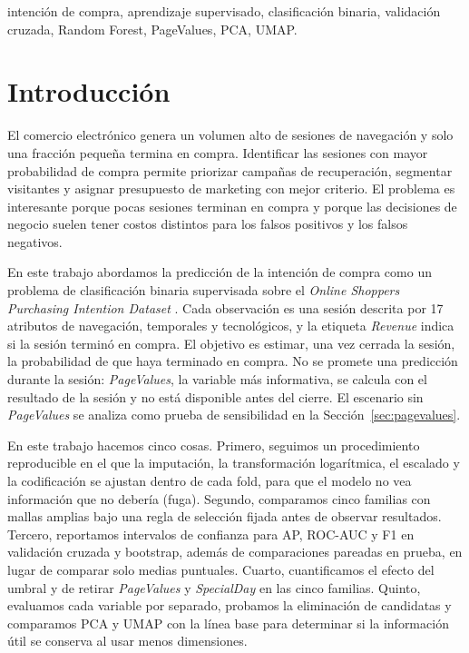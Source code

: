\documentclass[journal]{IEEEtran}
\begin{document}
\begin{IEEEkeywords}
	intención de compra, aprendizaje supervisado, clasificación binaria, validación
	cruzada, Random Forest, PageValues, PCA, UMAP.
\end{IEEEkeywords}

\section{Introducción}

El comercio electrónico genera un volumen alto de sesiones de navegación y solo una
fracción pequeña termina en compra. Identificar las sesiones con mayor probabilidad de
compra permite priorizar campañas de recuperación, segmentar visitantes y asignar
presupuesto de marketing con mejor criterio. El problema es interesante porque pocas sesiones
terminan en compra y porque las decisiones de negocio suelen tener costos distintos
para los falsos positivos y los falsos negativos.

En este trabajo abordamos la predicción de la intención de compra como un problema de
clasificación binaria supervisada sobre el \textit{Online Shoppers Purchasing Intention
Dataset} \cite{ref_dataset}. Cada observación es una sesión descrita por 17 atributos de
navegación, temporales y tecnológicos, y la etiqueta \textit{Revenue} indica si la sesión
terminó en compra. El objetivo es estimar, una vez cerrada la sesión, la probabilidad de
que haya terminado en compra. No se promete una predicción durante la sesión:
\textit{PageValues}, la variable más informativa, se calcula con el resultado de la
sesión y no está disponible antes del cierre. El escenario sin \textit{PageValues} se
analiza como prueba de sensibilidad en la Sección~\ref{sec:pagevalues}.

En este trabajo hacemos cinco cosas. Primero, seguimos un procedimiento reproducible en el que la
imputación, la transformación logarítmica, el escalado y la codificación se ajustan dentro
de cada fold, para que el modelo no vea información que no debería (fuga). Segundo, comparamos cinco familias con
mallas amplias bajo una regla de selección fijada antes de observar resultados. Tercero,
reportamos intervalos de confianza para AP, ROC-AUC y F1 en validación cruzada y bootstrap,
además de comparaciones pareadas en prueba, en lugar de comparar solo medias puntuales.
Cuarto, cuantificamos el efecto del umbral y de retirar \textit{PageValues} y
\textit{SpecialDay} en las cinco familias. Quinto, evaluamos cada variable por separado,
probamos la eliminación de candidatas y comparamos PCA y UMAP con la línea base para determinar
si la información útil se conserva al usar menos dimensiones.
\end{document}
